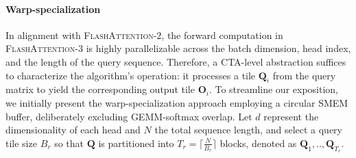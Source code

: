 \begin{enumerate}
\paragraph{Warp-specialization}  
In alignment with \textsc{FlashAttention-2}, the forward computation in \textsc{FlashAttention-3} is highly parallelizable across the batch dimension, head index, and the length of the query sequence. Therefore, a CTA-level abstraction suffices to characterize the algorithm’s operation: it processes a tile $\mathbf{Q}_i$ from the query matrix to yield the corresponding output tile $\mathbf{O}_i$. To streamline our exposition, we initially present the warp-specialization approach employing a circular SMEM buffer, deliberately excluding GEMM-softmax overlap. Let $d$ represent the dimensionality of each head and $N$ the total sequence length, and select a query tile size $B_r$ so that $\mathbf{Q}$ is partitioned into $T_r = \lceil \frac{N}{B_r} \rceil$ blocks, denoted as $\mathbf{Q}_1, .., \mathbf{Q}_{T_r}$.


\end{enumerate}
